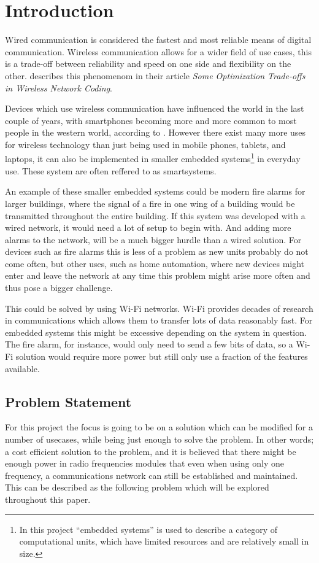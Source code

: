 \chapter{Introduction}
\vspace{-20pt}
Wired communication is considered the fastest and most reliable means of digital communication.
Wireless communication allows for a wider field of use cases, this is a trade-off between reliability and speed on one side and flexibility on the other. 
\citet{wirelessTradeoffs} describes this phenomenom in their article \emph{Some Optimization Trade-offs in Wireless Network Coding}.

Devices which use wireless communication have influenced the world in the last couple of years, with smartphones becoming more and more common to most people in the western world, according to \citet{2013-SmartPhoneUse}.
However there exist many more uses for wireless technology than just being used in mobile phones, tablets, and laptops, it can also be implemented in smaller embedded systems\footnote{In this project \enquote{embedded systems} is used to describe a category of computational units, which have limited resources and are relatively small in size. } in everyday use.
These system are often reffered to as smartsystems.

An example of these smaller embedded systems could be modern fire alarms for larger buildings, where the signal of a fire in one wing of a building would be transmitted throughout the entire building.
If this system was developed with a wired network, it would need a lot of setup to begin with.
And adding more alarms to the network, will be a much bigger hurdle than a wired solution. 
For devices such as fire alarms this is less of a problem as new units probably do not come often, but other uses, such as home automation, where new devices might enter and leave the network at any time this problem might arise more often and thus pose a bigger challenge.

This could be solved by using Wi-Fi networks.
Wi-Fi provides decades of research in communications which allows them to transfer lots of data reasonably fast.
For embedded systems this might be excessive depending on the system in question.
The fire alarm, for instance, would only need to send a few bits of data, so a Wi-Fi solution would require more power but still only use a fraction of the features available.

\newpage
\section{Problem Statement}\label{sec:problemStatement}
For this project the focus is going to be on a solution which can be modified for a number of usecases, while being just enough to solve the problem.
In other words; a cost efficient solution to the problem, and it is believed that there might be enough power in radio frequencies modules that even when using only one frequency, a communications network can still be established and maintained.
This can be described as the following problem which will be explored throughout this paper.

